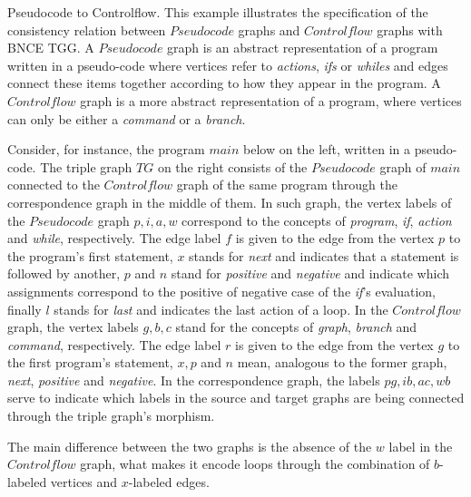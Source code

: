 \documentclass[runningheads]{llncs}
\begin{document}
\begin{example}{Pseudocode to Controlflow.}
	\label{ex:pseudocode2controlflow}
	This example illustrates the specification of the consistency relation between $Pseudocode$ graphs and $Controlflow$ graphs with BNCE TGG. A $Pseudocode$ graph is an abstract representation of a program written in a pseudo-code where vertices refer to \textit{actions}, \textit{ifs} or \textit{whiles} and edges connect these items together according to how they appear in the program. A $Controlflow$ graph is a more abstract representation of a program, where vertices can only be either a \textit{command} or a \textit{branch}.
	
	Consider, for instance, the program $main$ below on the left, written in a pseudo-code. The triple graph $TG$ on the right consists of the $Pseudocode$ graph of $main$ connected to the $Controlflow$ graph of the same program through the correspondence graph in the middle of them. In such graph, the vertex labels of the $Pseudocode$ graph $p, i, a, w$ correspond to the concepts of \textit{program}, \textit{if}, \textit{action} and \textit{while}, respectively. The edge label $f$ is given to the edge from the vertex $p$ to the program's first statement, $x$ stands for \textit{next} and indicates that a statement is followed by another, $p$ and $n$ stand for \textit{positive} and \textit{negative} and indicate which assignments correspond to the positive of negative case of the \textit{if}'s evaluation, finally $l$ stands for \textit{last} and indicates the last action of a loop. In the $Controlflow$ graph, the vertex labels $g, b, c$ stand for the concepts of \textit{graph}, \textit{branch} and \textit{command}, respectively. The edge label $r$ is given to the edge from the vertex $g$ to the first program's statement, $x, p$ and $n$ mean, analogous to the former graph, \textit{next}, \textit{positive} and \textit{negative}. In the correspondence graph, the labels $pg, ib, ac, wb$ serve to indicate which labels in the source and target graphs are being connected through the triple graph's morphism.
	
	
	
	The main difference between the two graphs is the absence of the $w$ label in the $Controlflow$ graph, what makes it encode loops through the combination of $b$-labeled vertices and $x$-labeled edges.
	

\end{example}
\end{document}
